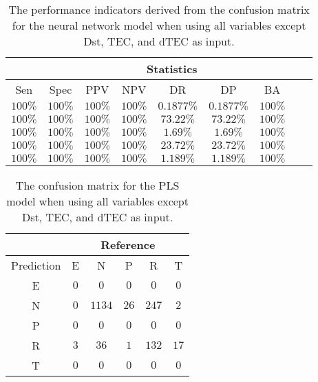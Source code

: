 \begin{table}[!ht]
	\centering
	\begin{tabular}{|c|c|c|c|c|c|c|c|c|}
		\hline
		 & \multicolumn{7}{c|}{Statistics} \\ \hline
		Sen & Spec & PPV & NPV & DR & DP & BA \\ \hline
		$100\%$ & $100\%$ & $100\%$ & $100\%$ & $0.1877\%$ & $0.1877\%$ & $100\%$ \\ \hline
		$100\%$ & $100\%$ & $100\%$ & $100\%$ & $73.22\%$ & $73.22\%$ & $100\%$ \\ \hline
		$100\%$ & $100\%$ & $100\%$ & $100\%$ & $1.69\%$ & $1.69\%$ & $100\%$ \\ \hline
		$100\%$ & $100\%$ & $100\%$ & $100\%$ & $23.72\%$ & $23.72\%$ & $100\%$ \\ \hline
		$100\%$ & $100\%$ & $100\%$ & $100\%$ & $1.189\%$ & $1.189\%$ & $100\%$ \\ \hline
	\end{tabular}
	\caption{The performance indicators derived from the confusion matrix for the neural network model when using all variables except Dst, TEC, and dTEC as input.}
	\label{tab:cs:noTEC:nnet}
\end{table}

\begin{table}[!ht]
	\centering
	\begin{tabular}{|c|c|c|c|c|c|}
		\hline
		 & \multicolumn{5}{|c|}{Reference} \\ \hline
		 Prediction & E & N & P & R & T \\ \hline
		 E & $0$ & $0$ & $0$ & $0$ & $0$ \\ \hline
		 N & $0$ & $1134$ & $26$ & $247$ & $2$ \\ \hline
		 P & $0$ & $0$ & $0$ & $0$ & $0$ \\ \hline
		 R & $3$ & $36$ & $1$ & $132$ & $17$ \\ \hline
		 T & $0$ & $0$ & $0$ & $0$ & $0$ \\ \hline
	\end{tabular}
	\caption{The confusion matrix for the PLS model when using all variables except Dst, TEC, and dTEC as input.}
	\label{tab:cm:noTEC:pls}
\end{table}

